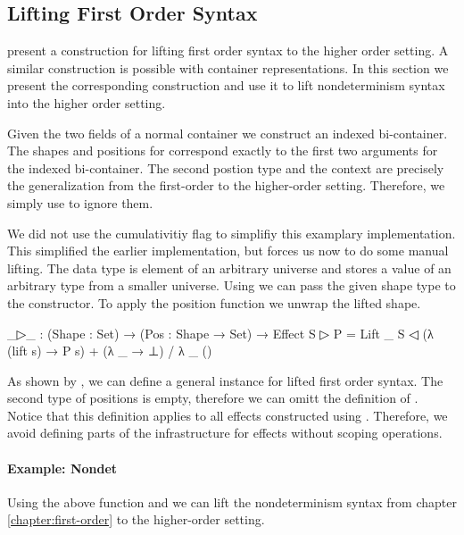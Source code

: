 \subsection{Lifting First Order Syntax}

\textcite{DBLP:conf/haskell/WuSH14} present a construction for lifting first
order syntax to the higher order setting.
A similar construction is possible with container representations.
In this section we present the corresponding construction and use it to
lift nondeterminism syntax into the higher order setting. 

Given the two fields of a normal container we construct an indexed bi-container.
The shapes and positions for  correspond exactly to the first
two arguments for the indexed bi-container.
The second postion type and the context are precisely the generalization from
the first-order to the higher-order setting.
Therefore, we simply use  to ignore them.

We did not use the cumulativitiy flag to simplifiy this examplary implementation.
This simplified the earlier implementation, but forces us now to do some manual
lifting.
The  data type is element of an arbitrary universe and stores
a value of an arbitrary type from a smaller universe.
Using  we can pass the given shape type to the constructor.
To apply the position function we unwrap the lifted shape.

\begin{code}
_▷_ : (Shape : Set) → (Pos : Shape → Set) → Effect
S ▷ P = Lift _ S ◁ (λ (lift s) → P s) + (λ _ → ⊥) / λ _ ()
\end{code}
As shown by \textcite{DBLP:conf/haskell/WuSH14}, we can define a general
 instance for lifted first order syntax.
The second type of positions is empty, therefore we can omitt the definition of
.
Notice that this definition applies to all effects constructed using
.
Therefore, we avoid defining parts of the infrastructure for effects without
scoping operations.


\paragraph{Example: Nondet}
Using the above function and  we can lift the
nondeterminism syntax from chapter \ref{chapter:first-order} to the higher-order
setting.


